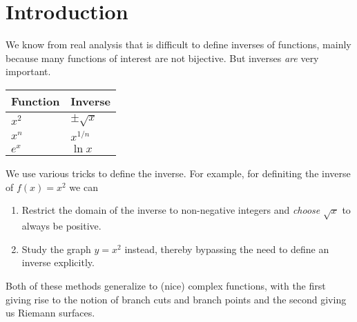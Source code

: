 \section{Introduction}
We know from real analysis that is difficult to define inverses of functions, mainly because many functions of interest are not bijective.
But inverses \emph{are} very important.
\begin{center}
  \begin{tabular}{l | l}
    Function & Inverse \\\hline
    $x^2$ & $\pm \sqrt{x}$ \\
    $x^n$ & $x^{1/n}$ \\
    $e^x$ & $\ln x$
  \end{tabular}
\end{center}
We use various tricks to define the inverse. For example, for definiting the inverse of $f(x) = x^2$ we can
\begin{enumerate}
  \item Restrict the domain of the inverse to non-negative integers and \emph{choose} $\sqrt{x}$ to always be positive.
  \item Study the graph $y = x^2$ instead, thereby bypassing the need to define an inverse explicitly.
\end{enumerate}
Both of these methods generalize to (nice) complex functions, with the first giving rise to the notion of branch cuts and branch points and the second giving us Riemann surfaces.
